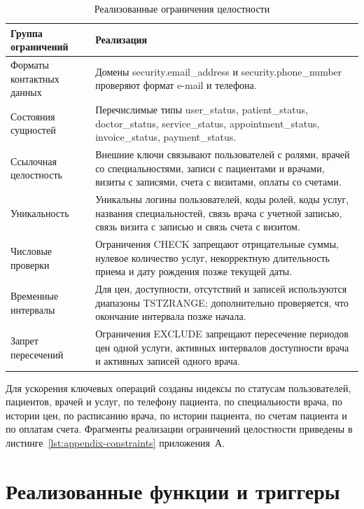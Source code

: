 \begin{table}[H]
    \centering
    \caption{Реализованные ограничения целостности}
    \label{tab:implemented-constraints}
    \footnotesize
    \renewcommand{\arraystretch}{1.1}
    \begin{tabularx}{\textwidth}{|>{\raggedright\arraybackslash}p{4.0cm}|>{\raggedright\arraybackslash}X|}
        \hline
        Группа ограничений & Реализация \tabularnewline
        \hline
        Форматы контактных данных & Домены security.email\_address и security.phone\_number проверяют формат e-mail и телефона. \tabularnewline
        \hline
        Состояния сущностей & Перечислимые типы user\_status, patient\_status, doctor\_status, service\_status, appointment\_status, invoice\_status, payment\_status. \tabularnewline
        \hline
        Ссылочная целостность & Внешние ключи связывают пользователей с ролями, врачей со специальностями, записи с пациентами и врачами, визиты с записями, счета с визитами, оплаты со счетами. \tabularnewline
        \hline
        Уникальность & Уникальны логины пользователей, коды ролей, коды услуг, названия специальностей, связь врача с учетной записью, связь визита с записью и связь счета с визитом. \tabularnewline
        \hline
        Числовые проверки & Ограничения CHECK запрещают отрицательные суммы, нулевое количество услуг, некорректную длительность приема и дату рождения позже текущей даты. \tabularnewline
        \hline
        Временные интервалы & Для цен, доступности, отсутствий и записей используются диапазоны TSTZRANGE; дополнительно проверяется, что окончание интервала позже начала. \tabularnewline
        \hline
        Запрет пересечений & Ограничения EXCLUDE запрещают пересечение периодов цен одной услуги, активных интервалов доступности врача и активных записей одного врача. \tabularnewline
        \hline
    \end{tabularx}
\end{table}
\normalsize

Для ускорения ключевых операций созданы индексы по статусам пользователей, пациентов, врачей и услуг, по телефону пациента, по специальности врача, по истории цен, по расписанию врача, по истории пациента, по счетам пациента и по оплатам счета. Фрагменты реализации ограничений целостности приведены в листинге~\ref{lst:appendix-constraints} приложения~А.

\section{Реализованные функции и триггеры}

